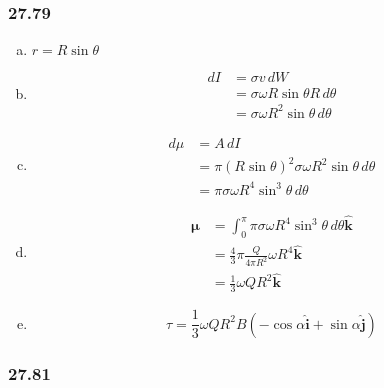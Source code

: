 \documentclass{article}
\begin{document}
\subsubsection{27.79}

\begin{enumerate}[(a)]
  \item $r = R \sin \theta$

  \item

        \begin{align*}
          dI & = \sigma v \,dW                           \\
             & = \sigma \omega R \sin \theta R \,d\theta \\
             & = \sigma \omega R^2 \sin \theta \,d\theta
        \end{align*}

  \item

        \begin{align*}
          d\mu & = A \,dI                                                        \\
               & = \pi (R \sin \theta)^2 \sigma \omega R^2 \sin \theta \,d\theta \\
               & = \pi \sigma \omega R^4 \sin^3 \theta \,d\theta
        \end{align*}

  \item

        \begin{align*}
          \boldsymbol{\mu} & = \int_0^\pi \pi \sigma \omega R^4 \sin^3 \theta \,d\theta \hat{\mathbf{k}} \\
                           & = \frac{4}{3} \pi \frac{Q}{4 \pi R^2} \omega R^4 \hat{\mathbf{k}}           \\
                           & = \frac{1}{3} \omega Q R^2 \hat{\mathbf{k}}
        \end{align*}

  \item \[\tau = \frac{1}{3} \omega Q R^2 B (-\cos \alpha \hat{\mathbf{i}} + \sin \alpha \hat{\mathbf{j}})\]
\end{enumerate}

\subsubsection{27.81}
\end{document}
